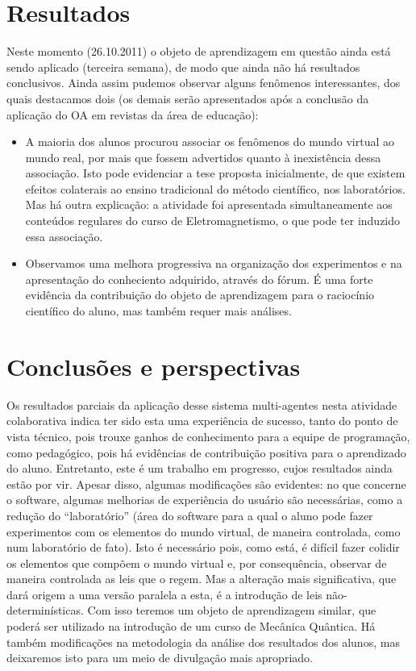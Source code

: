 \documentclass{article}
\begin{document}
\section{Resultados}

Neste momento (26.10.2011) o objeto de aprendizagem em questão ainda está
sendo aplicado (terceira semana), de modo que ainda não há resultados conclusivos.
Ainda assim pudemos observar alguns fenômenos interessantes, dos quais destacamos
dois (os demais serão apresentados após a conclusão da aplicação do OA em revistas da
área de educação):

\begin{itemize}
\item A maioria dos alunos procurou associar os fenômenos do mundo virtual ao
mundo real, por mais que fossem advertidos quanto à inexistência dessa
associação. Isto pode evidenciar a tese proposta inicialmente, de que existem
efeitos colaterais ao ensino tradicional do método científico, nos laboratórios.
Mas há outra explicação: a atividade foi apresentada simultaneamente aos
conteúdos regulares do curso de Eletromagnetismo, o que pode ter induzido essa
associação.
\item Observamos uma melhora progressiva na organização dos experimentos e na
apresentação do conheciento adquirido, através do fórum. É uma forte evidência
da contribuição do objeto de aprendizagem para o raciocínio científico do aluno,
mas também requer mais análises.
\end{itemize}

\section{Conclusões e perspectivas}

Os resultados parciais da aplicação desse sistema multi-agentes nesta atividade
colaborativa indica ter sido esta uma experiência de sucesso, tanto do ponto de vista
técnico, pois trouxe ganhos de conhecimento para a equipe de programação, como
pedagógico, pois há evidências de contribuição positiva para o aprendizado do aluno.
Entretanto, este é um trabalho em progresso, cujos resultados ainda estão por
vir. Apesar disso, algumas modificações são evidentes: no que concerne o software,
algumas melhorias de experiência do usuário são necessárias, como a redução
do “laboratório” (área do software para a qual o aluno pode fazer experimentos com
os elementos do mundo virtual, de maneira controlada, como num laboratório de fato).
Isto é necessário pois, como está, é difícil fazer colidir os elementos que compõem o
mundo virtual e, por consequência, observar de maneira controlada as leis que o regem.
Mas a alteração mais significativa, que dará origem a uma versão paralela a esta, é a
introdução de leis não-determinísticas. Com isso teremos um objeto de aprendizagem
similar, que poderá ser utilizado na introdução de um curso de Mecânica Quântica.
Há também modificações na metodologia da análise dos resultados dos alunos, mas
deixaremos isto para um meio de divulgação mais apropriado.



\end{document}
